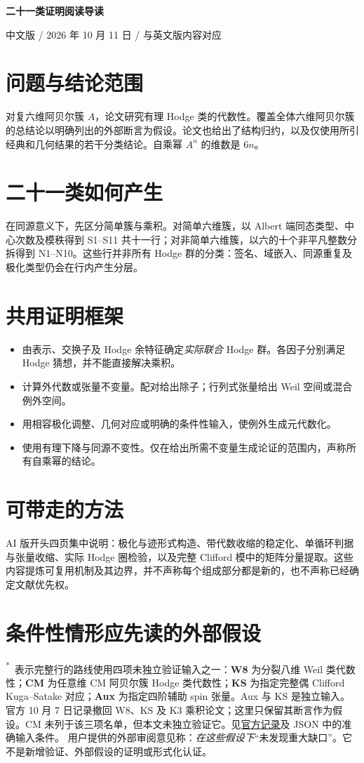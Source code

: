 \documentclass[10pt,a4paper]{article}
\newcommand{\external}{\textcolor{Warn}{\textsuperscript{*}}}
\begin{document}
{\LARGE\sffamily\bfseries\color{Ink}二十一类证明阅读导读}\par
{\small 中文版 / 2026 年 10 月 11 日 / 与英文版内容对应}
\section*{问题与结论范围}
对复六维阿贝尔簇 $A$，论文研究有理 Hodge 类的代数性。覆盖全体六维阿贝尔簇的总结论以明确列出的外部断言为假设。论文也给出了结构归约，以及仅使用所引经典和几何结果的若干分类结论。自乘幂 $A^n$ 的维数是 $6n$。
\section*{二十一类如何产生}
在同源意义下，先区分简单簇与乘积。对简单六维簇，以 Albert 端同态类型、中心次数及模秩得到 S1--S11 共十一行；对非简单六维簇，以六的十个非平凡整数分拆得到 N1--N10。这些行并非所有 Hodge 群的分类：签名、域嵌入、同源重复及极化类型仍会在行内产生分层。
\section*{共用证明框架}
\begin{itemize}
\item 由表示、交换子及 Hodge 余特征确定\emph{实际联合} Hodge 群。各因子分别满足 Hodge 猜想，并不能直接解决乘积。
\item 计算外代数或张量不变量。配对给出除子；行列式张量给出 Weil 空间或混合例外空间。
\item 用相容极化调整、几何对应或明确的条件性输入，使例外生成元代数化。
\item 使用有理下降与同源不变性。仅在给出所需不变量生成论证的范围内，声称所有自乘幂的结论。
\end{itemize}
\section*{可带走的方法}
AI 版开头四页集中说明：极化与迹形式构造、带代数收缩的稳定化、单循环判据与张量收缩、实际 Hodge 圈检验，以及完整 Clifford 模中的矩阵分量提取。这些内容提炼可复用机制及其边界，并不声称每个组成部分都是新的，也不声称已经确定文献优先权。
\section*{条件性情形应先读的外部假设}
\external\ 表示完整行的路线使用四项未独立验证输入之一：\textbf{W8} 为分裂八维 Weil 类代数性；\textbf{CM} 为任意维 CM 阿贝尔簇 Hodge 类代数性；\textbf{KS} 为指定完整偶 Clifford Kuga--Satake 对应；\textbf{Aux} 为指定四阶辅助 spin 张量。Aux 与 KS 是独立输入。官方 10 月 7 日记录撤回 W8、KS 及 K3 乘积论文；这里只保留其断言作为假设。CM 未列于该三项名单，但本文未独立验证它。见\href{https://github.com/openai/math/blob/main/history.md}{官方记录}及 JSON 中的准确输入条件。
用户提供的外部审阅意见称：\emph{在这些假设下}“未发现重大缺口”。它不是新增验证、外部假设的证明或形式化认证。
\newpage
\end{document}
